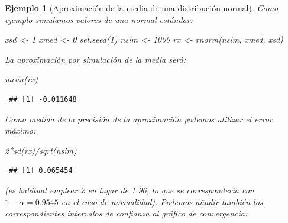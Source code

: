 \documentclass[
  10pt,
]{book}
\newenvironment{Shaded}{\begin{snugshade}}{\end{snugshade}}
\newcommand{\DecValTok}[1]{\textcolor[rgb]{0.00,0.00,0.81}{#1}}
\newcommand{\FunctionTok}[1]{\textcolor[rgb]{0.00,0.00,0.00}{#1}}
\newcommand{\NormalTok}[1]{#1}
\newcommand{\OtherTok}[1]{\textcolor[rgb]{0.56,0.35,0.01}{#1}}
\newcommand{\SpecialCharTok}[1]{\textcolor[rgb]{0.00,0.00,0.00}{#1}}
\theoremstyle{break}
\newtheorem{example}{Ejemplo}[chapter]
\theoremstyle{nonumberplain}
\begin{document}
\begin{example}[Aproximación de la media de una distribución normal]

Como ejemplo simulamos valores de una normal estándar:

\begin{Shaded}
\begin{Highlighting}[]
\NormalTok{xsd }\OtherTok{\textless{}{-}} \DecValTok{1}
\NormalTok{xmed }\OtherTok{\textless{}{-}} \DecValTok{0}
\FunctionTok{set.seed}\NormalTok{(}\DecValTok{1}\NormalTok{)}
\NormalTok{nsim }\OtherTok{\textless{}{-}} \DecValTok{1000}
\NormalTok{rx }\OtherTok{\textless{}{-}} \FunctionTok{rnorm}\NormalTok{(nsim, xmed, xsd)}
\end{Highlighting}
\end{Shaded}

La aproximación por simulación de la media será:

\begin{Shaded}
\begin{Highlighting}[]
\FunctionTok{mean}\NormalTok{(rx)}
\end{Highlighting}
\end{Shaded}

\begin{verbatim}
 ## [1] -0.011648
\end{verbatim}

Como medida de la precisión de la aproximación podemos utilizar el error máximo:

\begin{Shaded}
\begin{Highlighting}[]
\DecValTok{2}\SpecialCharTok{*}\FunctionTok{sd}\NormalTok{(rx)}\SpecialCharTok{/}\FunctionTok{sqrt}\NormalTok{(nsim)}
\end{Highlighting}
\end{Shaded}

\begin{verbatim}
 ## [1] 0.065454
\end{verbatim}

(es habitual emplear 2 en lugar de 1.96,
lo que se correspondería con \(1 - \alpha = 0.9545\) en el caso de normalidad).
Podemos añadir también los correspondientes intervalos de confianza al gráfico de convergencia:


\end{example}
\end{document}

